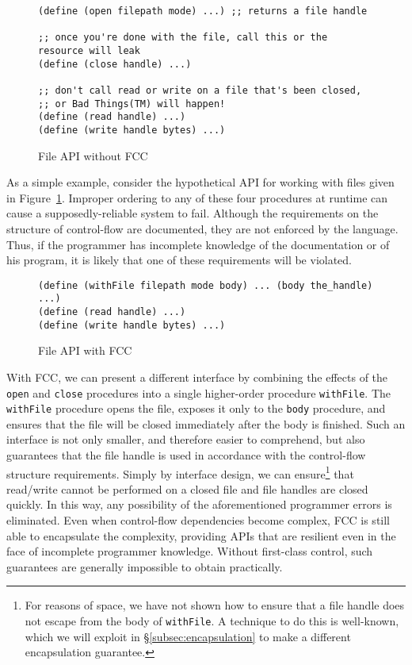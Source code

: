 \documentclass[11pt]{article}
\begin{document}
\begin{figure}
\caption{File API without FCC}
\label{fig:fileAPInoFCC}
\begin{verbatim}
(define (open filepath mode) ...) ;; returns a file handle

;; once you're done with the file, call this or the resource will leak
(define (close handle) ...)

;; don't call read or write on a file that's been closed,
;; or Bad Things(TM) will happen!
(define (read handle) ...)
(define (write handle bytes) ...)
\end{verbatim}
\end{figure}

As a simple example, consider the hypothetical API for working with files given in Figure~\ref{fig:fileAPInoFCC}.
Improper ordering to any of these four procedures at runtime can cause a supposedly-reliable system to fail.
Although the requirements on the structure of control-flow are documented, they are not enforced by the language.
Thus, if the programmer has incomplete knowledge of the documentation or of his program, it is likely that one of these requirements will be violated.

\begin{figure}
\caption{File API with FCC}
\label{fig:fileAPIFCC}
\begin{verbatim}
(define (withFile filepath mode body) ... (body the_handle) ...)
(define (read handle) ...)
(define (write handle bytes) ...)
\end{verbatim}
\end{figure}

With FCC, we can present a different interface by combining the effects of the \texttt{open} and \texttt{close} procedures into a single higher-order procedure \texttt{withFile}.
The \texttt{withFile} procedure opens the file, exposes it only to the \texttt{body} procedure, and ensures that the file will be closed immediately after the body is finished.
Such an interface is not only smaller, and therefore easier to comprehend, but also guarantees that the file handle is used in accordance with the control-flow structure requirements.
Simply by interface design, we can ensure\footnote{For reasons of space, we have not shown how to ensure that a file handle does not escape from the body of \texttt{withFile}. A technique to do this is well-known\cite{StateInHaskell}, which we will exploit in \S\ref{subsec:encapsulation} to make a different encapsulation guarantee.} that read/write cannot be performed on a closed file and file handles are closed quickly.
In this way, any possibility of the aforementioned programmer errors is eliminated.
Even when control-flow dependencies become complex, FCC is still able to encapsulate the complexity, providing APIs that are resilient even in the face of incomplete programmer knowledge.
Without first-class control, such guarantees are generally impossible to obtain practically.
\end{document}
